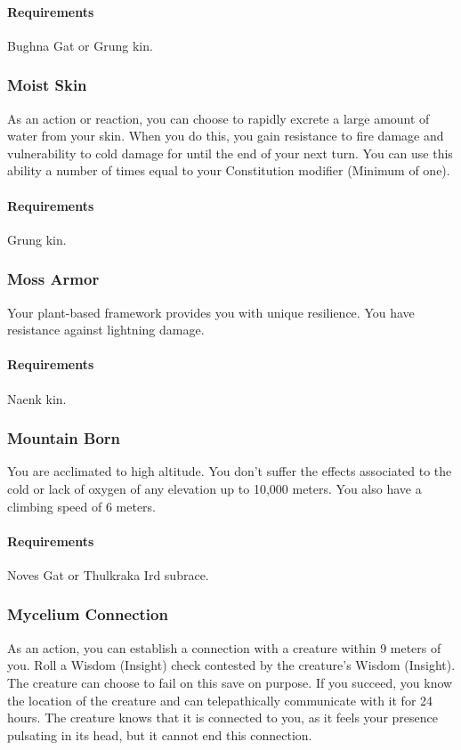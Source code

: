     \paragraph{Requirements} Bughna Gat or Grung kin.
\subsubsection{Moist Skin} \label{feat::moistskin}
    As an action or reaction, you can choose to rapidly excrete a large amount of water from your skin.
    When you do this, you gain resistance to fire damage and vulnerability to cold damage for until the end of your next turn.
    You can use this ability a number of times equal to your Constitution modifier (Minimum of one).
    \paragraph{Requirements} Grung kin.
\subsubsection{Moss Armor} \label{feat::mossarmor}
    Your plant-based framework provides you with unique resilience.
    You have resistance against lightning damage.
    \paragraph{Requirements} Naenk kin.
\subsubsection{Mountain Born} \label{feat::mountainborn}
    You are acclimated to high altitude.
    You don't suffer the effects associated to the cold or lack of oxygen of any elevation up to 10,000 meters.
    You also have a climbing speed of 6 meters.
    \paragraph{Requirements} Noves Gat or Thulkraka Ird subrace.
\subsubsection{Mycelium Connection} \label{feat::myceliumconnection}
    As an action, you can establish a connection with a creature within 9 meters of you.
    Roll a Wisdom (Insight) check contested by the creature's Wisdom (Insight).
    The creature can choose to fail on this save on purpose.
    If you succeed, you know the location of the creature and can telepathically communicate with it for 24 hours.
    The creature knows that it is connected to you, as it feels your presence pulsating in its head, but it cannot end this connection.

